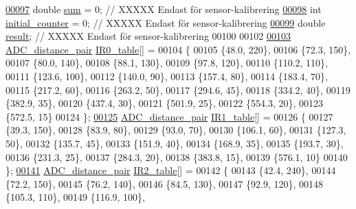 \begin{DoxyCode}
\hypertarget{sensor_8h_source.tex_l00097}{}\hyperlink{sensor_8h_a2943e5895f5488ed44ed4a86e59dcf1b}{00097} \textcolor{keywordtype}{double} \hyperlink{sensor_8h_a2943e5895f5488ed44ed4a86e59dcf1b}{sum} = 0;                  \textcolor{comment}{// XXXXX Endast för sensor-kalibrering}
\hypertarget{sensor_8h_source.tex_l00098}{}\hyperlink{sensor_8h_ae93891ebfd341a8e6528beb03dc590ab}{00098} \textcolor{keywordtype}{int} \hyperlink{sensor_8h_ae93891ebfd341a8e6528beb03dc590ab}{initial\_counter} = 0;     \textcolor{comment}{// XXXXX Endast för sensor-kalibrering}
\hypertarget{sensor_8h_source.tex_l00099}{}\hyperlink{sensor_8h_a4c9d9cb8bb9d2b707a152051408f40e5}{00099} \textcolor{keywordtype}{double} \hyperlink{sensor_8h_a4c9d9cb8bb9d2b707a152051408f40e5}{result};                    \textcolor{comment}{// XXXXX Endast för sensor-kalibrering}
00100 
00102 
\hypertarget{sensor_8h_source.tex_l00103}{}\hyperlink{sensor_8h_aea6f77b6de5d03286eddec97260b58d1}{00103} \hyperlink{struct_a_d_c__distance__pair}{ADC\_distance\_pair} \hyperlink{sensor_8h_aea6f77b6de5d03286eddec97260b58d1}{IR0\_table}[] =
00104 \{
00105     \{48.0, 220\},
00106     \{72.3, 150\},
00107     \{80.0, 140\},
00108     \{88.1, 130\},
00109     \{97.8, 120\},
00110     \{110.2, 110\},
00111     \{123.6, 100\},
00112     \{140.0, 90\},
00113     \{157.4, 80\},
00114     \{183.4, 70\},
00115     \{217.2, 60\},
00116     \{263.2, 50\},
00117     \{294.6, 45\},
00118     \{334.2, 40\},
00119     \{382.9, 35\},
00120     \{437.4, 30\},
00121     \{501.9, 25\},
00122     \{554.3, 20\},
00123     \{572.5, 15\}
00124 \}; 
\hypertarget{sensor_8h_source.tex_l00125}{}\hyperlink{sensor_8h_a8339fe4dbbee2308a5f1b0a2d813e1d5}{00125} \hyperlink{struct_a_d_c__distance__pair}{ADC\_distance\_pair} \hyperlink{sensor_8h_a8339fe4dbbee2308a5f1b0a2d813e1d5}{IR1\_table}[] =
00126 \{
00127     \{39.3, 150\},
00128     \{83.9, 80\},
00129     \{93.0, 70\},
00130     \{106.1, 60\},
00131     \{127.3, 50\},
00132     \{135.7, 45\},
00133     \{151.9, 40\},
00134     \{168.9, 35\},
00135     \{193.7, 30\},
00136     \{231.3, 25\},
00137     \{284.3, 20\},
00138     \{383.8, 15\},
00139     \{576.1, 10\}
00140 \};  
\hypertarget{sensor_8h_source.tex_l00141}{}\hyperlink{sensor_8h_a8d3372b9f99cdb0224731c68b95f831e}{00141} \hyperlink{struct_a_d_c__distance__pair}{ADC\_distance\_pair} \hyperlink{sensor_8h_a8d3372b9f99cdb0224731c68b95f831e}{IR2\_table}[] =
00142 \{
00143     \{42.4, 240\},
00144     \{72.2, 150\},
00145     \{76.2, 140\},
00146     \{84.5, 130\},
00147     \{92.9, 120\},
00148     \{105.3, 110\},
00149     \{116.9, 100\},

\end{DoxyCode}
